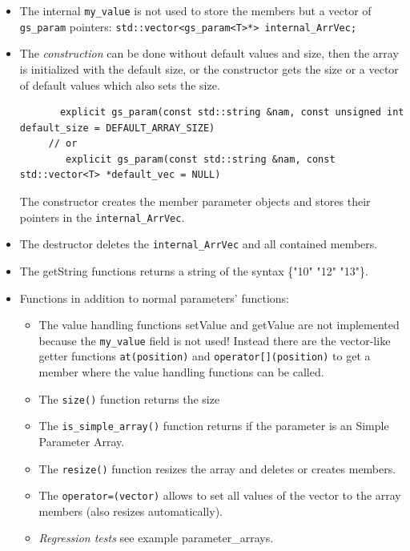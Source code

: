 \begin{itemize}
  \item The internal \lstinline|my_value| is not used to store the members but a vector of \lstinline|gs_param| pointers: \lstinline|std::vector<gs_param<T>*> internal_ArrVec;|

  \item The {\em construction} can be done without default values and size, then the array is initialized with the default size, or the constructor gets the size or a vector of default values which also sets the size.
\begin{lstlisting}
       explicit gs_param(const std::string &nam, const unsigned int default_size = DEFAULT_ARRAY_SIZE)
     // or
        explicit gs_param(const std::string &nam, const std::vector<T> *default_vec = NULL)
\end{lstlisting}
The constructor creates the member parameter objects and stores their pointers in the \lstinline|internal_ArrVec|.

  \item The destructor deletes the \lstinline|internal_ArrVec| and all contained members.

  \item The getString functions returns a string of the syntax \textsf{\{"10" "12" "13"\}}.

  \item Functions in addition to normal parameters' functions:
    \begin{itemize}
      \item The value handling functions setValue and getValue are not implemented because the \lstinline|my_value| field is not used! Instead there are the vector-like getter functions \mbox{\lstinline|at(position)|} and \lstinline|operator[](position)| to get a member where the value handling functions can be called.
      \item The \lstinline|size()| function returns the size
      \item The \lstinline|is_simple_array()| function returns if the parameter is an Simple Parameter Array.
      \item The \lstinline|resize()| function resizes the array and deletes or creates members.
      \item The \lstinline|operator=(vector)| allows to set all values of the vector to the array members (also resizes automatically).
      \item {\em Regression tests} see example \textsf{parameter\_arrays}.
    \end{itemize}

\end{itemize}

